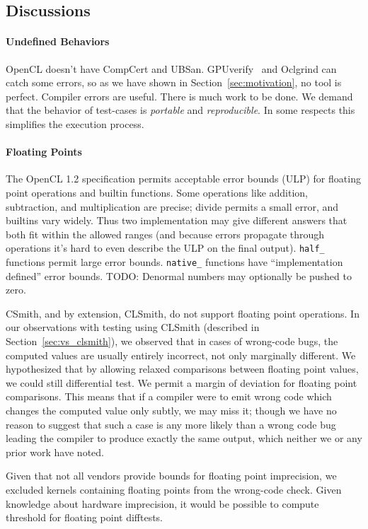\subsection{Discussions}

\paragraph{Undefined Behaviors} OpenCL doesn't have CompCert and UBSan. GPUverify~\cite{Betts2012} and Oclgrind can catch some errors, so as we have shown in Section~\ref{sec:motivation}, no tool is perfect. Compiler errors are useful. There is much work to be done. We demand that the behavior of test-cases is \emph{portable} and \emph{reproducible}. In some respects this simplifies the execution process.


\paragraph{Floating Points} The OpenCL 1.2 specification permits acceptable error bounds (ULP) for floating point operations and builtin functions. Some operations like addition, subtraction, and multiplication are precise; divide permits a small error, and builtins vary widely. Thus two implementation may give different answers that both fit within the allowed ranges (and because errors propagate through operations it's hard to even describe the ULP on the final output). \texttt{half\_} functions permit large error bounds. \texttt{native\_} functions have ``implementation defined'' error bounds. TODO: Denormal numbers may optionally be pushed to zero.

CSmith, and by extension, CLSmith, do not support floating point operations. In our observations with testing using CLSmith (described in Section~\ref{sec:vs_clsmith}), we observed that in cases of wrong-code bugs, the computed values are usually entirely incorrect, not only marginally different. We hypothesized that by allowing relaxed comparisons between floating point values, we could still differential test. We permit a margin of deviation for floating point comparisons. This means that if a compiler were to emit wrong code which changes the computed value only subtly, we may miss it; though we have no reason to suggest that such a case is any more likely than a wrong code bug leading the compiler to produce exactly the same output, which neither we or any prior work have noted.

Given that not all vendors provide bounds for floating point imprecision, we excluded kernels containing floating points from the wrong-code check. Given knowledge about hardware imprecision, it would be possible to compute threshold for floating point difftests.
